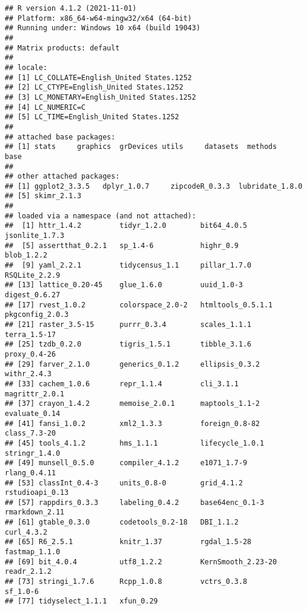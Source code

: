 \documentclass[
]{article}
\begin{document}
\begin{verbatim}
## R version 4.1.2 (2021-11-01)
## Platform: x86_64-w64-mingw32/x64 (64-bit)
## Running under: Windows 10 x64 (build 19043)
## 
## Matrix products: default
## 
## locale:
## [1] LC_COLLATE=English_United States.1252 
## [2] LC_CTYPE=English_United States.1252   
## [3] LC_MONETARY=English_United States.1252
## [4] LC_NUMERIC=C                          
## [5] LC_TIME=English_United States.1252    
## 
## attached base packages:
## [1] stats     graphics  grDevices utils     datasets  methods   base     
## 
## other attached packages:
## [1] ggplot2_3.3.5   dplyr_1.0.7     zipcodeR_0.3.3  lubridate_1.8.0
## [5] skimr_2.1.3    
## 
## loaded via a namespace (and not attached):
##  [1] httr_1.4.2         tidyr_1.2.0        bit64_4.0.5        jsonlite_1.7.3    
##  [5] assertthat_0.2.1   sp_1.4-6           highr_0.9          blob_1.2.2        
##  [9] yaml_2.2.1         tidycensus_1.1     pillar_1.7.0       RSQLite_2.2.9     
## [13] lattice_0.20-45    glue_1.6.0         uuid_1.0-3         digest_0.6.27     
## [17] rvest_1.0.2        colorspace_2.0-2   htmltools_0.5.1.1  pkgconfig_2.0.3   
## [21] raster_3.5-15      purrr_0.3.4        scales_1.1.1       terra_1.5-17      
## [25] tzdb_0.2.0         tigris_1.5.1       tibble_3.1.6       proxy_0.4-26      
## [29] farver_2.1.0       generics_0.1.2     ellipsis_0.3.2     withr_2.4.3       
## [33] cachem_1.0.6       repr_1.1.4         cli_3.1.1          magrittr_2.0.1    
## [37] crayon_1.4.2       memoise_2.0.1      maptools_1.1-2     evaluate_0.14     
## [41] fansi_1.0.2        xml2_1.3.3         foreign_0.8-82     class_7.3-20      
## [45] tools_4.1.2        hms_1.1.1          lifecycle_1.0.1    stringr_1.4.0     
## [49] munsell_0.5.0      compiler_4.1.2     e1071_1.7-9        rlang_0.4.11      
## [53] classInt_0.4-3     units_0.8-0        grid_4.1.2         rstudioapi_0.13   
## [57] rappdirs_0.3.3     labeling_0.4.2     base64enc_0.1-3    rmarkdown_2.11    
## [61] gtable_0.3.0       codetools_0.2-18   DBI_1.1.2          curl_4.3.2        
## [65] R6_2.5.1           knitr_1.37         rgdal_1.5-28       fastmap_1.1.0     
## [69] bit_4.0.4          utf8_1.2.2         KernSmooth_2.23-20 readr_2.1.2       
## [73] stringi_1.7.6      Rcpp_1.0.8         vctrs_0.3.8        sf_1.0-6          
## [77] tidyselect_1.1.1   xfun_0.29
\end{verbatim}
\end{document}
